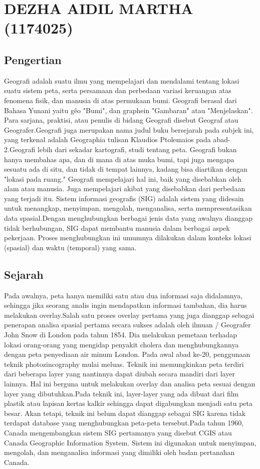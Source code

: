 \section{DEZHA AIDIL MARTHA (1174025)}
\subsection{Pengertian}
Geografi adalah suatu ilmu yang mempelajari dan mendalami tentang lokasi suatu sistem peta, serta persamaan dan perbedaan variasi keruangan atas fenomena fisik, dan manusia di atas permukaan bumi. Geografi berasal dari Bahasa Yunani yaitu gêo "Bumi", dan graphein "Gambaran" atau "Menjelaskan". Para sarjana, praktisi, atau penulis di bidang Geografi disebut Geograf atau Geografer.Geografi juga merupakan nama judul buku bersejarah pada subjek ini, yang terkenal adalah Geographia tulisan Klaudios Ptolemaios pada abad-2.Geografi lebih dari sekadar kartografi, studi tentang peta. Geografi bukan hanya membahas apa, dan di mana di atas muka bumi, tapi juga mengapa sesuatu ada di situ, dan tidak di tempat lainnya, kadang bisa diartikan dengan "lokasi pada ruang." Geografi mempelajari hal ini, baik yang disebabkan oleh alam atau manusia. Juga mempelajari akibat yang disebabkan dari perbedaan yang terjadi itu.\hfill\break
Sistem informasi geografis (SIG) adalah sistem yang didesain untuk menangkap, menyimpan, mengolah, menganalisa, serta mempresentasikan data spasial.Dengan menghubungkan berbagai jenis data yang awalnya dianggap tidak berhubungan, SIG dapat membantu manusia dalam berbagai aspek pekerjaan. Proses menghubungkan ini umumnya dilakukan dalam konteks lokasi (spasial) dan waktu (temporal) yang sama.
\subsection{Sejarah}
Pada awalnya, peta hanya memiliki satu atau dua informasi saja didalamnya, sehingga jika seorang analis ingin mendapatkan informasi tambahan, dia harus melakukan overlay.Salah satu proses overlay pertama yang juga dianggap sebagai penerapan analisa spasial pertama secara sukses adalah oleh ilmuan / Geografer John Snow di London pada tahun 1854. Dia melakukan pemetaan terhadap lokasi orang-orang yang mengidap penyakit cholera dan menghubungkannya dengan peta penyediaan air minum London.\hfill\break
Pada awal abad ke-20, penggunaan teknik photozincography mulai meluas. Teknik ini memungkinkan peta terdiri dari beberapa layer yang nantinnya dapat diubah secara mandiri dari layer lainnya. Hal ini berguna untuk melakukan overlay dan analisa peta sesuai dengan layer yang dibutuhkan.Pada teknik ini, layer-layer yang ada dibuat dari film plastik atau lapisan kertas kalkir sehingga dapat digabungkan menjadi satu peta besar. Akan tetapi, teknik ini belum dapat dianggap sebagai SIG karena tidak terdapat database yang menghubungkan peta-peta tersebut.Pada tahun 1960, Canada mengembangkan sistem SIG pertamanya yang disebut CGIS atau Canada Geographic Information System. Sistem ini digunakan untuk menyimpan, mengolah, dan menganalisa informasi yang dimiliki oleh badan pertanahan Canada.
